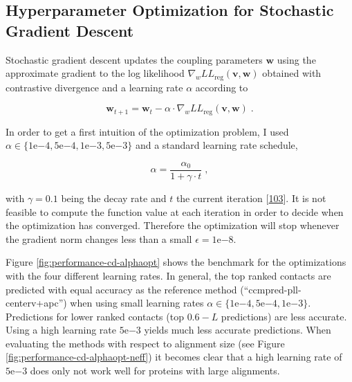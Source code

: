 \documentclass[12pt,a4paper,twoside]{book}
\newcommand{\LLreg}{L\!L_\mathrm{reg}}
\renewcommand{\v}{\mathbf{v}}
\newcommand{\w}{\mathbf{w}}
\theoremstyle{definition}
\theoremstyle{definition}
\theoremstyle{remark}
\begin{document}
\subsection{Hyperparameter Optimization for Stochastic Gradient
Descent}\label{hyperparameter-optimization-for-stochastic-gradient-descent}

Stochastic gradient descent updates the coupling parameters \(\w\) using
the approximate gradient to the log likelihood
\(\nabla_w \LLreg(\v,\w)\) obtained with contrastive divergence and a
learning rate \(\alpha\) according to

\begin{equation}
  \w_{t+1} = \w_t - \alpha \cdot \nabla_w \LLreg(\v,\w) \; .
\end{equation}

In order to get a first intuition of the optimization problem, I used
\(\alpha \in \{1\mathrm{e}{-4}, 5\mathrm{e}{-4}, 1\mathrm{e}{-3}, 5\mathrm{e}{-3}\}\)
and a standard learning rate schedule,

\begin{equation}
  \alpha  = \frac{\alpha_0}{1 + \gamma \cdot t} \; ,
\end{equation}

with \(\gamma=0.1\) being the decay rate and \(t\) the current iteration
{[}\protect\hyperlink{ref-Bottou2012}{103}{]}. It is not feasible to
compute the function value at each iteration in order to decide when the
optimization has converged. Therefore the optimization will stop
whenever the gradient norm changes less than a small
\(\epsilon=1\mathrm{e}{-8}\).

Figure \ref{fig:performance-cd-alphaopt} shows the benchmark for the
optimizations with the four different learning rates. In general, the
top ranked contacts are predicted with equal accuracy as the reference
method ({``ccmpred-pll-centerv+apc''}) when using small learning rates
\(\alpha \in \{1\mathrm{e}{-4}, 5\mathrm{e}{-4}, 1\mathrm{e}{-3} \}\).
Predictions for lower ranked contacts (top \(0.6-L\) predictions) are
less accurate. Using a high learning rate \(5\mathrm{e}{-3}\) yields
much less accurate predictions. When evaluating the methods with respect
to alignment size (see Figure \ref{fig:performance-cd-alphaopt-neff}) it
becomes clear that a high learning rate of \(5\mathrm{e}{-3}\) does only
not work well for proteins with large alignments.
\end{document}
